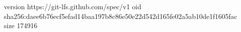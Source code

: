 version https://git-lfs.github.com/spec/v1
oid sha256:daee6b76ecf5efad14baa197b8c86e50e22d542d165fe02a5ab10de1f1605fac
size 174916
